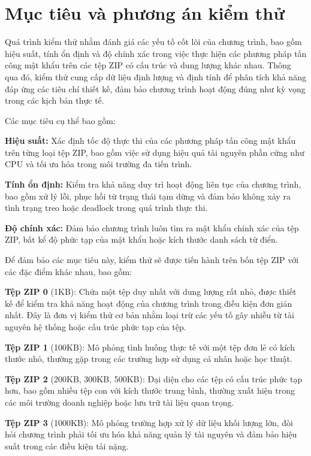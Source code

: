 \documentclass[../DoAn.tex]{subfiles}
\begin{document}
\section{Mục tiêu và phương án kiểm thử}

Quá trình kiểm thử nhằm đánh giá các yếu tố cốt lõi của chương trình, bao gồm hiệu suất, tính ổn định và độ chính xác trong việc thực hiện các phương pháp tấn công mật khẩu trên các tệp ZIP có cấu trúc và dung lượng khác nhau. Thông qua đó, kiểm thử cung cấp dữ liệu định lượng và định tính để phân tích khả năng đáp ứng các tiêu chí thiết kế, đảm bảo chương trình hoạt động đúng như kỳ vọng trong các kịch bản thực tế.

Các mục tiêu cụ thể bao gồm:

\textbf{Hiệu suất: }Xác định tốc độ thực thi của các phương pháp tấn công mật khẩu trên từng loại tệp ZIP, bao gồm việc sử dụng hiệu quả tài nguyên phần cứng như CPU và tối ưu hóa trong môi trường đa tiến trình.

\textbf{Tính ổn định: }Kiểm tra khả năng duy trì hoạt động liên tục của chương trình, bao gồm xử lý lỗi, phục hồi từ trạng thái tạm dừng và đảm bảo không xảy ra tình trạng treo hoặc deadlock trong quá trình thực thi.

\textbf{Độ chính xác: }Đảm bảo chương trình luôn tìm ra mật khẩu chính xác của tệp ZIP, bất kể độ phức tạp của mật khẩu hoặc kích thước danh sách từ điển.

Để đảm bảo các mục tiêu này, kiểm thử sẽ được tiến hành trên bốn tệp ZIP với các đặc điểm khác nhau, bao gồm:

\textbf{Tệp ZIP 0} (1KB): Chứa một tệp duy nhất với dung lượng rất nhỏ, được thiết kế để kiểm tra khả năng hoạt động của chương trình trong điều kiện đơn giản nhất. Đây là đơn vị kiểm thử cơ bản nhằm loại trừ các yếu tố gây nhiễu từ tài nguyên hệ thống hoặc cấu trúc phức tạp của tệp.

\textbf{Tệp ZIP 1} (100KB): Mô phỏng tình huống thực tế với một tệp đơn lẻ có kích thước nhỏ, thường gặp trong các trường hợp sử dụng cá nhân hoặc học thuật.

\textbf{Tệp ZIP 2} (200KB, 300KB, 500KB): Đại diện cho các tệp có cấu trúc phức tạp hơn, bao gồm nhiều tệp con với kích thước trung bình, thường xuất hiện trong các môi trường doanh nghiệp hoặc lưu trữ tài liệu quan trọng.

\textbf{Tệp ZIP 3} (1000KB): Mô phỏng trường hợp xử lý dữ liệu khối lượng lớn, đòi hỏi chương trình phải tối ưu hóa khả năng quản lý tài nguyên và đảm bảo hiệu suất trong các điều kiện tải nặng.
\end{document}
